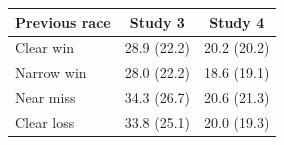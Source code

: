\begin{tabular}{lcc}
\toprule
Previous race & Study 3 & Study 4 \\
\midrule
Clear win & 28.9 (22.2) & 20.2 (20.2) \\
Narrow win & 28.0 (22.2) & 18.6 (19.1) \\
Near miss & 34.3 (26.7) & 20.6 (21.3) \\
Clear loss & 33.8 (25.1) & 20.0 (19.3) \\
\bottomrule
\end{tabular}
